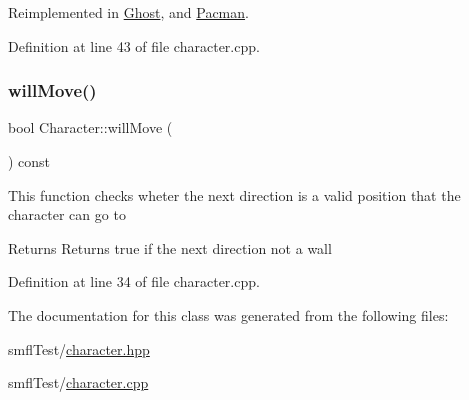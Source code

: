 Reimplemented in \hyperlink{class_ghost_a164e0607f7ea0d72d756bdf964e66b90}{Ghost}, and \hyperlink{class_pacman_a6badb47a28223991a1eb540f9d970e77}{Pacman}.



Definition at line 43 of file character.\+cpp.

\mbox{\label{class_character_a53d02c2b1c914990e51e0fb84913d151}} 
\subsubsection{\texorpdfstring{will\+Move()}{willMove()}}
{\footnotesize\ttfamily bool Character\+::will\+Move (\begin{DoxyParamCaption}{ }\end{DoxyParamCaption}) const}

This function checks wheter the next direction is a valid position that the character can go to

\begin{DoxyReturn}{Returns}
Returns true if the next direction not a wall 
\end{DoxyReturn}


Definition at line 34 of file character.\+cpp.



The documentation for this class was generated from the following files\+:\begin{DoxyCompactItemize}
\item 
smfl\+Test/\hyperlink{character_8hpp}{character.\+hpp}\item 
smfl\+Test/\hyperlink{character_8cpp}{character.\+cpp}\end{DoxyCompactItemize}
